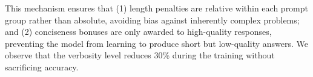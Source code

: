 This mechanism ensures that (1) length penalties are relative within each prompt group rather than absolute, avoiding bias against inherently complex problems; and (2) conciseness bonuses are only awarded to high-quality responses, preventing the model from learning to produce short but low-quality answers. We observe that the verbosity level reduces 30\% during the training without sacrificing accuracy.

